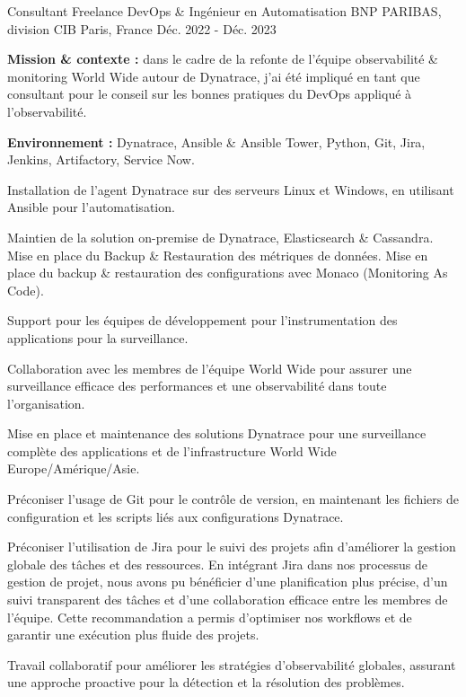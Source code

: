 \begin{cventries}
\cventry
{Consultant Freelance DevOps \& Ingénieur en Automatisation} %
{BNP PARIBAS, division CIB} %
{Paris, France} %
{Déc. 2022 - Déc. 2023} %
{
  \begin{cvitems}
    \item {\textbf{Mission \& contexte :} dans le cadre de la refonte de l'équipe observabilité \& monitoring World Wide autour de Dynatrace, j'ai été impliqué en tant que consultant pour le conseil sur les bonnes pratiques du DevOps appliqué à l'observabilité.}
    \item {\textbf{Environnement :} Dynatrace, Ansible \& Ansible Tower, Python, Git, Jira, Jenkins, Artifactory, Service Now.}
    \item {Installation de l'agent Dynatrace sur des serveurs Linux et Windows, en utilisant Ansible pour l'automatisation.}
    \item {Maintien de la solution on-premise de Dynatrace, Elasticsearch \& Cassandra. Mise en place du Backup \& Restauration des métriques de données. Mise en place du backup \& restauration des configurations avec Monaco (Monitoring As Code).}
    \item {Support pour les équipes de développement pour l'instrumentation des applications pour la surveillance.}
    \item {Collaboration avec les membres de l'équipe World Wide pour assurer une surveillance efficace des performances et une observabilité dans toute l'organisation.}
    \item {Mise en place et maintenance des solutions Dynatrace pour une surveillance complète des applications et de l'infrastructure World Wide Europe/Amérique/Asie.}
    \item {Préconiser l'usage de Git pour le contrôle de version, en maintenant les fichiers de configuration et les scripts liés aux configurations Dynatrace.}
    \item {Préconiser l'utilisation de Jira pour le suivi des projets afin d'améliorer la gestion globale des tâches et des ressources. En intégrant Jira dans nos processus de gestion de projet, nous avons pu bénéficier d'une planification plus précise, d'un suivi transparent des tâches et d'une collaboration efficace entre les membres de l'équipe. Cette recommandation a permis d'optimiser nos workflows et de garantir une exécution plus fluide des projets.}
    \item {Travail collaboratif pour améliorer les stratégies d'observabilité globales, assurant une approche proactive pour la détection et la résolution des problèmes.}
  \end{cvitems}
}


\end{cventries}
